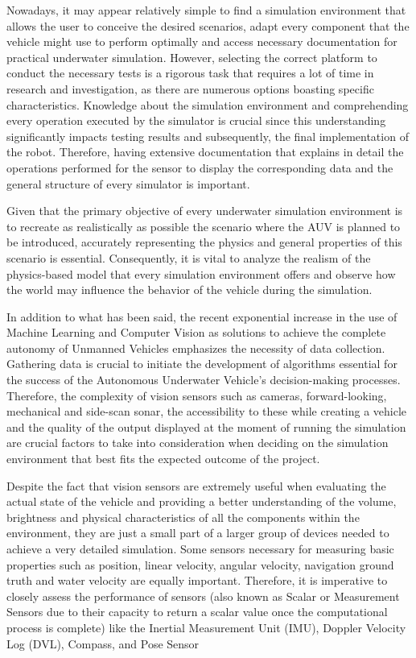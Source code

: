 \documentclass[]{article}
\begin{document}
	Nowadays, it may appear relatively simple to find a simulation environment that allows the user to conceive the desired scenarios, adapt every component that the vehicle might use to perform optimally and access necessary documentation for practical underwater simulation. However, selecting the correct platform to conduct the necessary tests is a rigorous task that requires a lot of time in research and investigation, as there are numerous options boasting specific characteristics. Knowledge about the simulation environment and comprehending every operation executed by the simulator is crucial since this understanding significantly impacts testing results and subsequently, the final implementation of the robot. Therefore, having extensive documentation that explains in detail the operations performed for the sensor to display the corresponding data and the general structure of every simulator is important.
	
	Given that the primary objective of every underwater simulation environment is to recreate as realistically as possible the scenario where the AUV is planned to be introduced, accurately representing the physics and general properties of this scenario is essential. Consequently, it is vital to analyze the realism of the physics-based model that every simulation environment offers and observe how the world may influence the behavior of the vehicle during the simulation.
	
	In addition to what has been said, the recent exponential increase in the use of Machine Learning and Computer Vision as solutions to achieve the complete autonomy of Unmanned Vehicles emphasizes the necessity of data collection. Gathering data is crucial to initiate the development of algorithms essential for the success of the Autonomous Underwater Vehicle's decision-making processes. Therefore, the complexity of vision sensors such as cameras, forward-looking, mechanical and side-scan sonar, the accessibility to these while creating a vehicle and the quality of the output displayed at the moment of running the simulation are crucial factors to take into consideration when deciding on the simulation environment that best fits the expected outcome of the project.
	
	Despite the fact that vision sensors are extremely useful when evaluating the actual state of the vehicle and providing a better understanding of the volume, brightness and physical characteristics of all the components within the environment, they are just a small part of a larger group of devices needed to achieve a very detailed simulation. Some sensors necessary for measuring basic properties such as position, linear velocity, angular velocity, navigation ground truth and water velocity are equally important. Therefore, it is imperative to closely assess the performance of sensors (also known as Scalar or Measurement Sensors due to their capacity to return a scalar value once the computational process is complete) like the Inertial Measurement Unit (IMU), Doppler Velocity Log (DVL), Compass, and Pose Sensor
	
\end{document}
